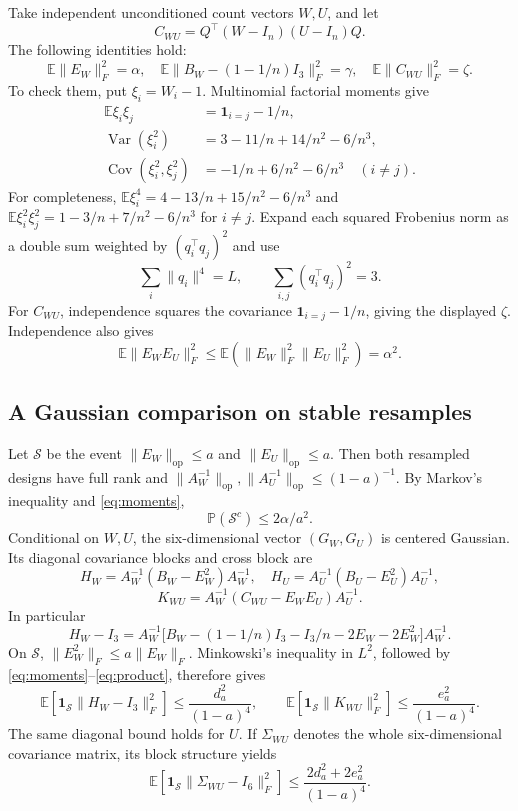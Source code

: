 \documentclass[11pt]{article}
\newcommand{\Prob}{\mathbb P}
\newcommand{\E}{\mathbb E}
\begin{document}
Take independent unconditioned count vectors $W,U$, and let
\[
 C_{WU}=Q^\top(W-I_n)(U-I_n)Q.
\]
The following identities hold:
\begin{equation}\label{eq:moments}
 \E\|E_W\|_F^2=\alpha,\quad
 \E\|B_W-(1-1/n)I_3\|_F^2=\gamma,\quad
 \E\|C_{WU}\|_F^2=\zeta.
\end{equation}
To check them, put $\xi_i=W_i-1$. Multinomial factorial moments give
\begin{align*}
 \E\xi_i\xi_j&=\mathbf1_{i=j}-1/n,\\
 \operatorname{Var}(\xi_i^2)&=3-11/n+14/n^2-6/n^3,\\
 \operatorname{Cov}(\xi_i^2,\xi_j^2)
    &=-1/n+6/n^2-6/n^3\quad(i\ne j).
\end{align*}
For completeness,
$\E\xi_i^4=4-13/n+15/n^2-6/n^3$ and
$\E\xi_i^2\xi_j^2=1-3/n+7/n^2-6/n^3$ for $i\ne j$.
Expand each squared Frobenius norm as a double sum weighted by
$(q_i^\top q_j)^2$ and use
\[
 \sum_i\|q_i\|^4=L,\qquad
 \sum_{i,j}(q_i^\top q_j)^2=3.
\]
For $C_{WU}$, independence squares the covariance
$\mathbf1_{i=j}-1/n$, giving the displayed $\zeta$.
Independence also gives
\begin{equation}\label{eq:product}
 \E\|E_WE_U\|_F^2
 \le\E(\|E_W\|_F^2\|E_U\|_F^2)=\alpha^2.
\end{equation}

\subsection{A Gaussian comparison on stable resamples}

Let $\mathcal S$ be the event
$\|E_W\|_{\mathrm{op}}\le a$ and
$\|E_U\|_{\mathrm{op}}\le a$.
Then both resampled designs have full rank and
$\|A_W^{-1}\|_{\mathrm{op}},\|A_U^{-1}\|_{\mathrm{op}}\le(1-a)^{-1}$.
By Markov's inequality and \eqref{eq:moments},
\begin{equation}\label{eq:unstable}
 \Prob(\mathcal S^c)\le2\alpha/a^2.
\end{equation}
Conditional on $W,U$, the six-dimensional vector $(G_W,G_U)$ is centered
Gaussian. Its diagonal covariance blocks and cross block are
\[
 H_W=A_W^{-1}(B_W-E_W^2)A_W^{-1},\quad
 H_U=A_U^{-1}(B_U-E_U^2)A_U^{-1},
\]
\[
 K_{WU}=A_W^{-1}(C_{WU}-E_WE_U)A_U^{-1}.
\]
In particular
\[
 H_W-I_3=A_W^{-1}
  \bigl[B_W-(1-1/n)I_3-I_3/n-2E_W-2E_W^2\bigr]A_W^{-1}.
\]
On $\mathcal S$, $\|E_W^2\|_F\le a\|E_W\|_F$. Minkowski's inequality in
$L^2$, followed by \eqref{eq:moments}--\eqref{eq:product}, therefore gives
\[
 \E[\mathbf1_{\mathcal S}\|H_W-I_3\|_F^2]
    \le\frac{d_a^2}{(1-a)^4},\qquad
 \E[\mathbf1_{\mathcal S}\|K_{WU}\|_F^2]
    \le\frac{e_a^2}{(1-a)^4}.
\]
The same diagonal bound holds for $U$. If $\Sigma_{WU}$ denotes the whole
six-dimensional covariance matrix, its block structure yields
\begin{equation}\label{eq:jointmoment}
 \E[\mathbf1_{\mathcal S}\|\Sigma_{WU}-I_6\|_F^2]
    \le\frac{2d_a^2+2e_a^2}{(1-a)^4}.
\end{equation}
\end{document}
